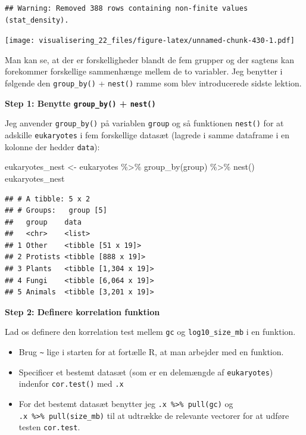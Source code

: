 \documentclass[
]{book}
\newenvironment{Shaded}{\begin{snugshade}}{\end{snugshade}}
\newcommand{\FunctionTok}[1]{\textcolor[rgb]{0.00,0.00,0.00}{#1}}
\newcommand{\NormalTok}[1]{#1}
\newcommand{\OtherTok}[1]{\textcolor[rgb]{0.56,0.35,0.01}{#1}}
\newcommand{\SpecialCharTok}[1]{\textcolor[rgb]{0.00,0.00,0.00}{#1}}
\providecommand{\tightlist}{%
  \setlength{\itemsep}{0pt}\setlength{\parskip}{0pt}}
\begin{document}
\begin{verbatim}
## Warning: Removed 388 rows containing non-finite values (stat_density).
\end{verbatim}

\texttt{[image: visualisering\_22\_files/figure-latex/unnamed-chunk-430-1.pdf]}

Man kan se, at der er forskelligheder blandt de fem grupper og der sagtens kan forekommer forskellige sammenhænge mellem de to variabler. Jeg benytter i følgende den \texttt{group\_by()} + \texttt{nest()} ramme som blev introducerede sidste lektion.

\textbf{Step 1: Benytte \texttt{group\_by()} + \texttt{nest()}}

Jeg anvender \texttt{group\_by()} på variablen \texttt{group} og så funktionen \texttt{nest()} for at adskille \texttt{eukaryotes} i fem forskellige datasæt (lagrede i samme dataframe i en kolonne der hedder \texttt{data}):

\begin{Shaded}
\begin{Highlighting}[]
\NormalTok{eukaryotes\_nest }\OtherTok{\textless{}{-}}\NormalTok{ eukaryotes }\SpecialCharTok{\%\textgreater{}\%} 
  \FunctionTok{group\_by}\NormalTok{(group) }\SpecialCharTok{\%\textgreater{}\%} 
  \FunctionTok{nest}\NormalTok{()}
\NormalTok{eukaryotes\_nest}
\end{Highlighting}
\end{Shaded}

\begin{verbatim}
## # A tibble: 5 x 2
## # Groups:   group [5]
##   group    data                 
##   <chr>    <list>               
## 1 Other    <tibble [51 x 19]>   
## 2 Protists <tibble [888 x 19]>  
## 3 Plants   <tibble [1,304 x 19]>
## 4 Fungi    <tibble [6,064 x 19]>
## 5 Animals  <tibble [3,201 x 19]>
\end{verbatim}

\textbf{Step 2: Definere korrelation funktion}

Lad os definere den korrelation test mellem \texttt{gc} og \texttt{log10\_size\_mb} i en funktion.

\begin{itemize}
\tightlist
\item
  Brug \texttt{\textasciitilde{}} lige i starten for at fortælle R, at man arbejder med en funktion.
\item
  Specificer et bestemt datasæt (som er en delemængde af \texttt{eukaryotes}) indenfor \texttt{cor.test()} med \texttt{.x}
\item
  For det bestemt datasæt benytter jeg \texttt{.x\ \%\textgreater{}\%\ pull(gc)} og \texttt{.x\ \%\textgreater{}\%\ pull(size\_mb)} til at udtrække de relevante vectorer for at udføre testen \texttt{cor.test}.
\end{itemize}
\end{document}
